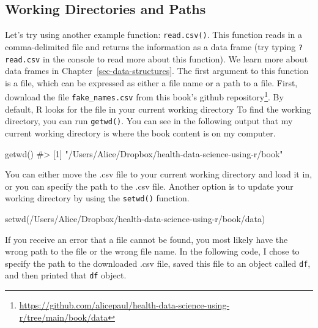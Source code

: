 \documentclass[
  letterpaper,
]{latex/krantz}
\makeatletter
\newenvironment{Shaded}{\begin{snugshade}}{\end{snugshade}}
\newcommand{\CommentTok}[1]{\textcolor[rgb]{0.37,0.37,0.37}{#1}}
\newcommand{\FunctionTok}[1]{\textcolor[rgb]{0.28,0.35,0.67}{#1}}
\newcommand{\NormalTok}[1]{\textcolor[rgb]{0.00,0.23,0.31}{#1}}
\newcommand{\StringTok}[1]{\textcolor[rgb]{0.13,0.47,0.30}{#1}}
\renewcommand{\href}[2]{#2\footnote{\url{#1}}}
\newenvironment{kframe}{%
\medskip{}
\setlength{\fboxsep}{.8em}
 \def\at@end@of@kframe{}%
 \ifinner\ifhmode%
  \def\at@end@of@kframe{\end{minipage}}%
  \begin{minipage}{\columnwidth}%
 \fi\fi%
 \def\FrameCommand##1{\hskip\@totalleftmargin \hskip-\fboxsep
 \colorbox{shadecolor}{##1}\hskip-\fboxsep
     \hskip-\linewidth \hskip-\@totalleftmargin \hskip\columnwidth}%
 \MakeFramed {\advance\hsize-\width
   \@totalleftmargin\z@ \linewidth\hsize
   \@setminipage}}%
 {\par\unskip\endMakeFramed%
 \at@end@of@kframe}
\renewenvironment{Shaded}{\begin{kframe}}{\end{kframe}}
\makeatother
\begin{document}
\subsection{Working Directories and
Paths}\label{working-directories-and-paths}

Let's try using another example function:
\texttt{read.csv()}.
This function reads in a comma-delimited file and returns the
information as a data frame (try typing \texttt{?read.csv} in the
console to read more about this function). We learn more about data
frames in Chapter~\ref{sec-data-structures}. The first argument to this
function is a file, which can be expressed as either a file name or a
path to a file. First, download the file \texttt{fake\_names.csv} from
this book's
\href{https://github.com/alicepaul/health-data-science-using-r/tree/main/book/data}{github
repository}. By default, R looks for the file in your current working
directory To find the working directory, you
can run \texttt{getwd()}.
You can see in the following output that my current working directory is
where the book content is on my computer.

\begin{Shaded}
\begin{Highlighting}[]
\FunctionTok{getwd}\NormalTok{()}
\CommentTok{\#\textgreater{} [1] "/Users/Alice/Dropbox/health{-}data{-}science{-}using{-}r/book"}
\end{Highlighting}
\end{Shaded}

You can either move the .csv file to your current working directory and
load it in, or you can specify the path to the .csv file. Another option
is to update your working directory by using the
\texttt{setwd()} function.

\begin{Shaded}
\begin{Highlighting}[]
\FunctionTok{setwd}\NormalTok{(}\StringTok{\textquotesingle{}/Users/Alice/Dropbox/health{-}data{-}science{-}using{-}r/book/data\textquotesingle{}}\NormalTok{)}
\end{Highlighting}
\end{Shaded}

If you receive an error that a file cannot be found, you most likely
have the wrong path to the file or the wrong file name. In the following
code, I chose to specify the path to the downloaded .csv file, saved
this file to an object called \texttt{df}, and then printed that
\texttt{df} object.
\end{document}
